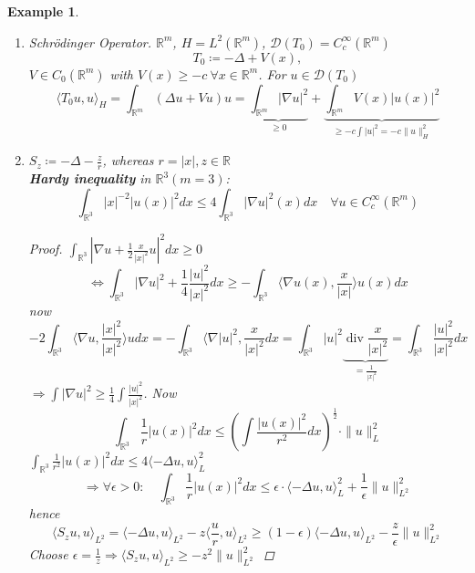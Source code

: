\documentclass[12pt]{extreport} %
\newcommand{\R}{\mathbb{R}}
\newcommand{\DO}[1]{\mathcal{D}\left( {#1} \right)}
\theoremstyle{named}
\theoremstyle{nnamed}
\theoremstyle{itshape}
\theoremstyle{normal}
\newtheorem*{example}{Example}
\begin{document}
\begin{example} ~\
	\begin{enumerate}
		\item Schrödinger Operator. $\R^m$, $H = L^2(\R^m)$, $\DO{T_0} = C_c^\infty(\R^m)$
				$$ T_0 \coloneqq - \Delta + V(x), $$
			$V \in C_0(\R^m)$ with $V(x) \geq - c ~\forall x \in \R^m$. For $u \in \DO{T_0}$
			$$ \langle T_0 u, u \rangle_H = \int_{\R^m} \left( \Delta u + V u \right) u = \underbrace{\int_{\R^m} \left| \nabla u \right|^2}_{\geq 0} + \underbrace{\int_{\R^m} V(x) \left| u(x) \right|^2}_{\geq - c \int |u|^2 = - c \|u \|^2_H} $$
		\item $S_z \coloneqq - \Delta - \frac{z}{r}$, whereas $r = |x|, z \in \R$ ~\\ 
		
			\textbf{Hardy inequality} in $\R^3 (m = 3)$:
				$$ \int_{\R^3} |x|^{-2} |u(x)|^2 dx \leq  4 \int_{\R^3} \left| \nabla u \right|^2 (x) dx \quad \forall u \in C_c^\infty(\R^m) $$
				\begin{proof}
					$\int_{\R^3} \left| \nabla u + \frac{1}{2} \frac{x}{|x|^2} u \right|^2 dx \geq 0$ 
					$$ \iff \int_{\R^3} \left| \nabla u \right|^2 + \frac{1}{4} \frac{|u|^2}{|x|^2} dx \geq - \int_{\R^3} \langle \nabla u(x), \frac{x}{|x|} \rangle u(x) dx $$
					now
					$$ -2 \int_{\R^3} \langle \nabla u, \frac {|x|^2}{|x|^2} \rangle u dx = - \int_{\R^3} \langle \nabla |u|^2, \frac{x}{|x|^2} dx = \int_{\R^3} |u|^2 \underbrace{\operatorname{div} \frac{x}{|x|^2}}_{= \frac{1}{|x|^2}} = \int_{\R^3} \frac{|u|^2}{|x|^2} dx $$ %
					$\Rightarrow \int |\nabla u|^2 \geq \frac{1}{4} \int \frac{|u|^2}{|x|^2}$. Now
					$$ \int_{\R^3} \frac{1}{r} |u(x)|^2 dx \leq \left( \int \frac{|u(x)|^2}{r^2} dx \right)^{\frac{1}{2}} \cdot \| u \|_L^2 $$
					$\int_{\R^3} \frac{1}{r^2} |u(x)|^2 dx \leq 4 \langle - \Delta u, u \rangle_L^2$
					$$ \Rightarrow \forall \epsilon > 0: \quad \int_{\R^3} \frac{1}{r} |u(x)|^2 dx \leq \epsilon \cdot \langle-\Delta u, u \rangle_L^2 + \frac{1}{\epsilon} \| u \|_{L^2}^2 $$
					hence 
					$$ \langle S_z u, u \rangle_{L^2} = \langle - \Delta u, u \rangle_{L^2} - z \langle \frac{u}{r}, u \rangle_{L^2} \geq (1 - \epsilon) \langle - \Delta u, u \rangle_{L^2} - \frac{z}{\epsilon} \| u \|^2_{L^2} $$
					Choose $\epsilon = \frac{1}{z} \Rightarrow \langle S_z u, u \rangle_{L^2} \geq - z^2 \| u\|^2_{L^2}$
				\end{proof}
	\end{enumerate}	
\end{example}
\end{document}
